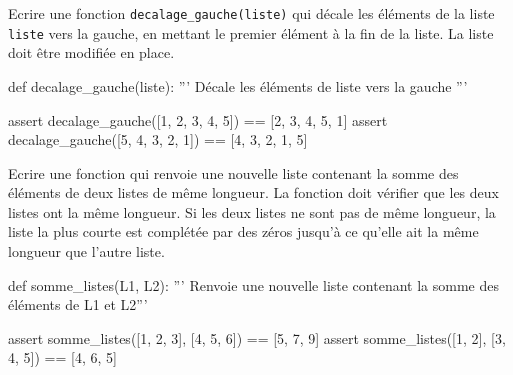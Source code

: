 			\begin{exercice_cours}[Effets de bord et fonctions]{}
	 Ecrire une fonction \texttt{decalage\_gauche(liste)} qui décale les éléments de la liste \texttt{liste} vers la gauche, en mettant le premier élément à la fin de la liste. La liste doit être modifiée en place.
					\begin{CodePythontexAlt}[TaillePolice=\normalsize, Largeur=1\linewidth,Centre,PremLigne=1, Lignes=false]{}
					def decalage_gauche(liste):
						''' Décale les éléments de liste vers la gauche '''






						

					assert decalage_gauche([1, 2, 3, 4, 5]) == [2, 3, 4, 5, 1]
					assert decalage_gauche([5, 4, 3, 2, 1]) == [4, 3, 2, 1, 5]
					\end{CodePythontexAlt}

			\end{exercice_cours}
\begin{exercice_cours}{}

Ecrire une fonction qui renvoie une nouvelle liste contenant la somme des éléments de deux listes de même longueur. La fonction doit vérifier que les deux listes ont la même longueur. Si les deux listes ne sont pas de même longueur, la liste la plus courte est complétée par des zéros jusqu'à ce qu'elle ait la même longueur que l'autre liste.
\begin{CodePythontexAlt}[TaillePolice=\normalsize, Largeur=1\linewidth,Centre,PremLigne=1, Lignes=false]{}
def somme_listes(L1, L2):
	''' Renvoie une nouvelle liste contenant la somme des éléments de L1 et L2'''











assert somme_listes([1, 2, 3], [4, 5, 6]) == [5, 7, 9]
assert somme_listes([1, 2], [3, 4, 5]) == [4, 6, 5]
\end{CodePythontexAlt}
\end{exercice_cours}

		\pagebreak

